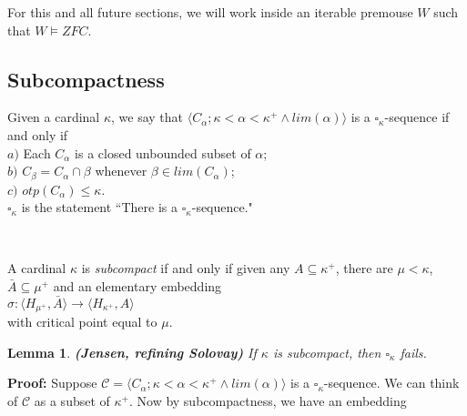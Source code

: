 \documentclass[12pt]{article}
\newtheorem{lem}[thm]{Lemma}
\begin{document}
For this and all future sections, we will work inside an iterable premouse $W$ such that $W \models ZFC$.\\



\subsection{Subcompactness}

\begin{def} \label{square}
Given a cardinal $\kappa$, we say that $\langle C_\alpha ; \kappa < \alpha < \kappa^+ \wedge lim( \alpha ) \rangle$ is a $\square_\kappa$-sequence if and only if\\

\indent $a)$ Each $C_\alpha$ is a closed unbounded subset of $\alpha$;\\

\indent $b)$ $C_\beta = C_\alpha \cap \beta$ whenever $\beta \in lim (C_\alpha )$;\\

\indent $c)$ $otp (C_\alpha ) \leq \kappa$.\\

$\square_\kappa$ is the statement ``There is a $\square_\kappa$-sequence."
\end{def}\\


\begin{def} \label{subcompact}
A cardinal $\kappa$ is \textit{subcompact} if and only if given any $A \subseteq \kappa^+$, there are $\mu < \kappa$, $\bar{A} \subseteq \mu^+$ and an elementary embedding\\

\indent \indent $\sigma : \langle H_{\mu^+} , \bar{A} \rangle \longrightarrow \langle H_{\kappa^+ }, A \rangle$\\

with critical point equal to $\mu$.
\end{def}


\begin{lem} \textbf{(Jensen, refining Solovay)}
If $\kappa$ is subcompact, then $\square_\kappa$ fails.
\end{lem}

\indent \indent \textbf{Proof:} Suppose $\mathscr{C} = \langle C_\alpha ; \kappa < \alpha < \kappa^+ \wedge lim( \alpha ) \rangle$ is a $\square_\kappa$-sequence.  We can think of $\mathscr{C}$ as a subset of $\kappa^+$.  Now by subcompactness, we have an embedding\\
\end{document}
